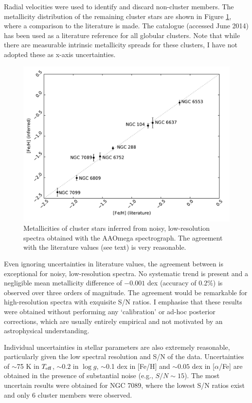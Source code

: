 \documentclass{aastex}
\begin{document}
Radial velocities were used to identify and discard non-cluster members. The metallicity distribution of the remaining cluster stars are shown in Figure \ref{fig:clusters}, where a comparison to the literature is made. The \citet{harris} catalogue (accessed June 2014) has been used as a literature reference for all globular clusters. Note that while there are measurable intrinsic metallicity spreads for these clusters, I have not adopted these as x-axis uncertainties.

\begin{figure}
\label{fig:clusters}
\includegraphics[width=\textwidth]{clusters.pdf}
\caption{Metallicities of cluster stars inferred from noisy, low-resolution spectra obtained with the AAOmega spectrograph. The agreement with the literature values (see text) is very reasonable.}
\end{figure}

Even ignoring uncertainties in literature values, the agreement between is exceptional for noisy, low-resolution spectra. No systematic trend is present and a negligible mean metallicity difference of $-0.001$ dex (accuracy of 0.2\%) is observed over three orders of magnitude. The agreement would be remarkable for high-resolution spectra with exquisite S/N ratios. I emphasise that these results were obtained without performing any `calibration' or ad-hoc posterior corrections, which are usually entirely empirical and not motivated by an astrophysical understanding.

Individual uncertainties in stellar parameters are also extremely reasonable, particularly given the low spectral resolution and S/N of the data. Uncertainties of $\sim$75 K in $T_{\rm eff}$, $\sim0.2$ in $\log{g}$, $\sim$0.1 dex in [Fe/H] and $\sim0.05$ dex in [$\alpha$/Fe] are obtained in the presence of substantial noise (e.g., $S/N \sim 15$). The most uncertain results were obtained for NGC 7089, where the lowest S/N ratios exist and only 6 cluster members were observed.
\end{document}

